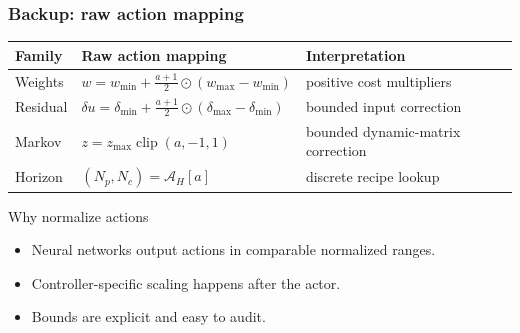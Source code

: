 \documentclass[aspectratio=169]{beamer}
\newcommand{\clip}{\operatorname{clip}}
\begin{document}
\begin{frame}
\frametitle{\large \textbf{Backup: raw action mapping}}
\scriptsize

\begin{center}
\renewcommand{\arraystretch}{1.25}
\begin{tabular}{p{}p{}p{}}
\toprule
\textbf{Family} & \textbf{Raw action mapping} & \textbf{Interpretation}\\
\midrule
Weights &
\(w=w_{\min}+\frac{a+1}{2}\odot(w_{\max}-w_{\min})\) &
positive cost multipliers\\
Residual &
\(\delta u=\delta_{\min}+\frac{a+1}{2}\odot(\delta_{\max}-\delta_{\min})\) &
bounded input correction\\
Markov &
\(z=z_{\max}\clip(a,-1,1)\) &
bounded dynamic-matrix correction\\
Horizon &
\((N_p,N_c)=\mathcal{A}_H[a]\) &
discrete recipe lookup\\
\bottomrule
\end{tabular}
\end{center}

\vspace{0.15cm}
\begin{block}{Why normalize actions}
\begin{itemize}\justifying
  \setlength\itemsep{0.35ex}
  \item Neural networks output actions in comparable normalized ranges.
  \item Controller-specific scaling happens after the actor.
  \item Bounds are explicit and easy to audit.
\end{itemize}
\end{block}
\end{frame}
\end{document}
